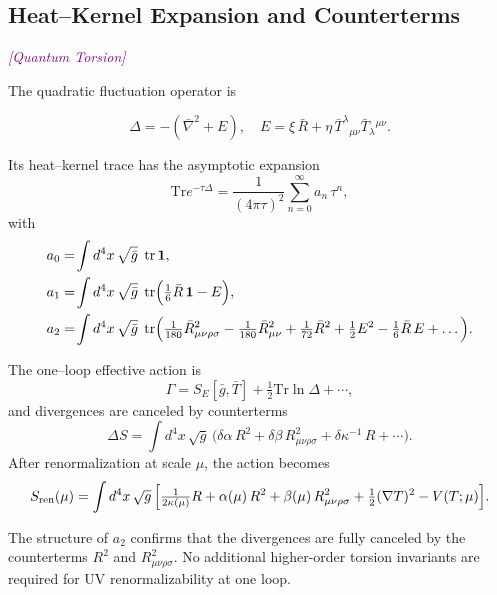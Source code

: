 \documentclass{article}
\DeclareMathOperator{\tr}{tr}
\newcommand{\Tr}{\mathrm{Tr}}
\newcommand{\quantumtag}{\textcolor{purple}{\textit{[Quantum Torsion]}}}
\begin{document}
\subsection{Heat–Kernel Expansion and Counterterms}
\label{sec:heat_kernel}
\quantumtag


The quadratic fluctuation operator is

\begin{equation}
  \Delta = -(\bar\nabla^2 + E),
  \quad
  E = \xi \,\bar R + \eta\,\bar T^{\lambda}{}_{\mu\nu}\bar T_{\lambda}{}^{\mu\nu}.
\end{equation}

Its heat–kernel trace has the asymptotic expansion
\begin{equation}\label{eq:auto79}
\Tr e^{-\tau\Delta}
  = \frac{1}{(4\pi\tau)^2}\sum_{n=0}^\infty a_n\,\tau^n,
\end{equation}
with
\begin{align*}
  a_0 &= \!\int d^4x\,\sqrt{\bar g}\;\tr\mathbf1,\\
  a_1 &= \!\int d^4x\,\sqrt{\bar g}\;\tr\Bigl(\tfrac16\bar R\,\mathbf1 - E\Bigr),\\
  a_2 &= \!\int d^4x\,\sqrt{\bar g}\;\tr\Bigl(
      \tfrac1{180}\bar R_{\mu\nu\rho\sigma}^2
    - \tfrac1{180}\bar R_{\mu\nu}^2
    + \tfrac1{72}\bar R^2
    + \tfrac12E^2
    - \tfrac16\bar R\,E
    + \dots
  \Bigr).
\end{align*}

The one–loop effective action is
\begin{equation}\label{eq:auto80}
\Gamma = S_E[\bar g,\bar T] + \tfrac12\Tr\ln\Delta + \cdots,
\end{equation}
and divergences are canceled by counterterms
\begin{equation}\label{eq:auto81}
\Delta S = \int d^4x\,\sqrt{g}\,
  \bigl(\delta\alpha\,R^2 + \delta\beta\,R_{\mu\nu\rho\sigma}^2
    + \delta\kappa^{-1}\,R + \cdots\bigr).
\end{equation}
After renormalization at scale \(\mu\), the action becomes
\begin{equation}\label{eq:auto82}
S_{\rm ren}(\mu)
  = \int d^4x\,\sqrt{g}\,
  \Bigl[
    \tfrac1{2\kappa(\mu)}R
    + \alpha(\mu)\,R^2
    + \beta(\mu)\,R_{\mu\nu\rho\sigma}^2
    + \tfrac12(\nabla T)^2
    - V(T;\mu)
  \Bigr].
\end{equation}


The structure of \(a_2\) confirms that the divergences are fully canceled by the counterterms \(R^2\) and \(R_{\mu\nu\rho\sigma}^2\). No additional higher-order torsion invariants are required for UV renormalizability at one loop.
\end{document}
